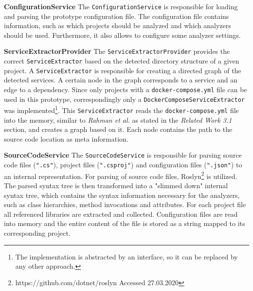 \documentclass{article}
\begin{document}
\noindent\textbf{ConfigurationService}\newline
The \lstinline{ConfigurationService} is responsible for loading and parsing the prototype configuration file. The configuration file contains information, such as which projects should be analyzed and which analyzers should be used. Furthermore, it also allows to configure some analyzer settings. \newline

\noindent\textbf{ServiceExtractorProvider}\newline
The \lstinline{ServiceExtractorProvider} provides the correct \lstinline{ServiceExtractor} based on the detected directory structure of a given project. A \lstinline{ServiceExtractor} is responsible for creating a directed graph of the detected services. A certain node in the graph corresponds to a service and an edge to a dependency. Since only projects with a \lstinline{docker-compose.yml} file can be used in this prototype, correspondingly only a \lstinline{DockerComposeServiceExtractor} was implemented\footnote{The implementation is abstracted by an interface, so it can be replaced by any other approach.}. This \lstinline{ServiceExtractor} reads the \lstinline{docker-compose.yml} file into the memory, similar to \textit{Rahman et al.} \cite{imranur_curated_2019} as stated in the \textit{Related Work 3.1} section, and creates a graph based on it. Each node contains the path to the source code location as meta information. \newline

\noindent\textbf{SourceCodeService}\newline
The \lstinline{SourceCodeService} is responsible for parsing source code files (\lstinline{".cs"}), project files (\lstinline{".csproj"}) and configuration files (\lstinline{".json"}) to an internal representation. For parsing of source code files, Roslyn\footnote{https://github.com/dotnet/roslyn Accessed 27.03.2020} is utilized. The parsed syntax tree is then transformed into a "slimmed down" internal syntax tree, which contains the syntax information necessary for the analyzers, such as class hierarchies, method invocations and attributes. For each project file all referenced libraries are extracted and collected. Configuration files are read into memory and the entire content of the file is stored as a string mapped to its corresponding project. \newline
\end{document}
